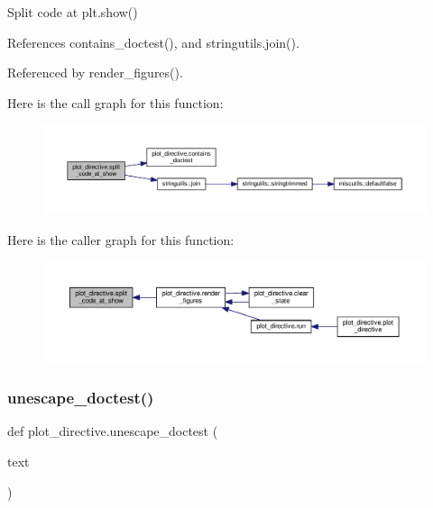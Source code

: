 \begin{DoxyVerb}Split code at plt.show()\end{DoxyVerb}
 

References contains\+\_\+doctest(), and stringutils.\+join().



Referenced by render\+\_\+figures().

Here is the call graph for this function\+:
\nopagebreak
\begin{figure}[H]
\begin{center}
\leavevmode
\includegraphics[width=350pt]{namespaceplot__directive_afda02d52fee93a95c4b928b0d4b250aa_cgraph}
\end{center}
\end{figure}
Here is the caller graph for this function\+:
\nopagebreak
\begin{figure}[H]
\begin{center}
\leavevmode
\includegraphics[width=350pt]{namespaceplot__directive_afda02d52fee93a95c4b928b0d4b250aa_icgraph}
\end{center}
\end{figure}
\mbox{\label{namespaceplot__directive_aa899adfc2219ac7af0aa9ae176a2c11b}} 
\subsubsection{\texorpdfstring{unescape\+\_\+doctest()}{unescape\_doctest()}}
{\footnotesize\ttfamily def plot\+\_\+directive.\+unescape\+\_\+doctest (\begin{DoxyParamCaption}\item[{}]{text }\end{DoxyParamCaption})}

